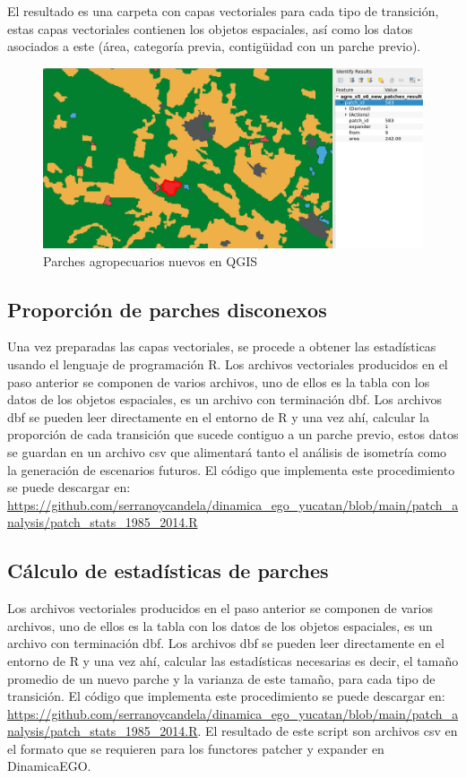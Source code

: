\documentclass[12pt,a4paper,oldfontcommands]{article}
\begin{document}
El resultado es una carpeta con capas vectoriales para cada tipo de transición, estas capas vectoriales contienen los objetos espaciales, así como los datos asociados a este (área, categoría previa, contigüidad con un parche previo). 

\begin{figure}[h]
	\centering
	\includegraphics[width=1\textwidth]{./figuras/parches.png}
	\caption{Parches agropecuarios nuevos en QGIS}
	\label{fig:parches}
\end{figure}


\subsection{Proporción de parches disconexos}
Una vez preparadas las capas vectoriales, se procede a obtener las estadísticas usando el lenguaje de programación R. Los archivos vectoriales producidos en el paso anterior se componen de varios archivos, uno de ellos es la tabla con los datos de los objetos espaciales, es un archivo con terminación dbf. Los archivos dbf se pueden leer directamente en el entorno de R y una vez ahí, calcular la proporción de cada transición que sucede contiguo a un parche previo, estos datos se guardan en un archivo csv que alimentará tanto el análisis de isometría como la generación de escenarios futuros. El código que implementa este procedimiento se puede descargar en:  \url{https://github.com/serranoycandela/dinamica_ego_yucatan/blob/main/patch_analysis/patch_stats_1985_2014.R}
\subsection{Cálculo de estadísticas de parches}
Los archivos vectoriales producidos en el paso anterior se componen de varios archivos, uno de ellos es la tabla con los datos de los objetos espaciales, es un archivo con terminación dbf. Los archivos dbf se pueden leer directamente en el entorno de R y una vez ahí, calcular las estadísticas necesarias es decir, el tamaño promedio de un nuevo parche y la varianza de este tamaño, para cada tipo de transición. El código que implementa este procedimiento se puede descargar en: \url{https://github.com/serranoycandela/dinamica_ego_yucatan/blob/main/patch_analysis/patch_stats_1985_2014.R}. El resultado de este script son archivos csv en el formato que se requieren para los functores patcher y expander en DinamicaEGO.
\end{document}
